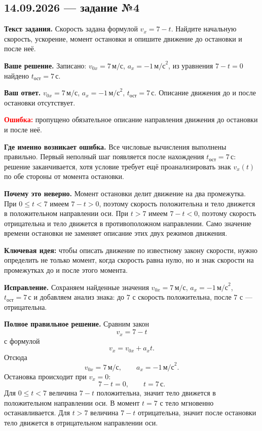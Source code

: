 \documentclass[12pt,a4paper]{article}
\newcommand{\taskhead}[1]{\subsection*{#1}}
\newcommand{\field}[1]{\textbf{#1}}
\begin{document}
\newpage
{}\label{task:14-4}
\taskhead{14.09.2026 --- задание №4}

\field{Текст задания.} Скорость задана формулой $v_x=7-t$. Найдите начальную скорость, ускорение, момент остановки и опишите движение до остановки и после неё.

\field{Ваше решение.} Записано: $v_{0x}=7\,\text{м/с}$, $a_x=-1\,\text{м/с}^2$, из уравнения $7-t=0$ найдено $t_{\text{ост}}=7\,\text{с}$.

\field{Ваш ответ.} $v_{0x}=7\,\text{м/с}$, $a_x=-1\,\text{м/с}^2$, $t_{\text{ост}}=7\,\text{с}$. Описание движения до и после остановки отсутствует.

\textcolor{red}{\textbf{Ошибка:}} пропущено обязательное описание направления движения до остановки и после неё.

\field{Где именно возникает ошибка.} Все числовые вычисления выполнены правильно. Первый неполный шаг появляется после нахождения $t_{\text{ост}}=7\,\text{с}$: решение заканчивается, хотя условие требует ещё проанализировать знак $v_x(t)$ по обе стороны от момента остановки.

\field{Почему это неверно.} Момент остановки делит движение на два промежутка. При $0\le t<7$ имеем $7-t>0$, поэтому скорость положительна и тело движется в положительном направлении оси. При $t>7$ имеем $7-t<0$, поэтому скорость отрицательна и тело движется в противоположном направлении. Само значение времени остановки не заменяет описание этих двух режимов движения.

\textcolor{blue!60!black}{\textbf{Ключевая идея:}} чтобы описать движение по известному закону скорости, нужно определить не только момент, когда скорость равна нулю, но и знак скорости на промежутках до и после этого момента.

\field{Исправление.} Сохраняем найденные значения $v_{0x}=7\,\text{м/с}$, $a_x=-1\,\text{м/с}^2$, $t_{\text{ост}}=7\,\text{с}$ и добавляем анализ знака: до $7$ с скорость положительна, после $7$ с --- отрицательна.

\field{Полное правильное решение.} Сравним закон
\[
v_x=7-t
\]
с формулой
\[
v_x=v_{0x}+a_xt.
\]
Отсюда
\[
v_{0x}=7\,\text{м/с},\qquad a_x=-1\,\text{м/с}^2.
\]
Остановка происходит при $v_x=0$:
\[
7-t=0,\qquad t=7\,\text{с}.
\]
Для $0\le t<7$ величина $7-t$ положительна, значит тело движется в положительном направлении оси. В момент $t=7$ с тело мгновенно останавливается. Для $t>7$ величина $7-t$ отрицательна, значит после остановки тело движется в отрицательном направлении оси.
\end{document}
